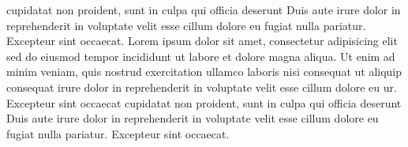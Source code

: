 \documentclass[a4paper, oneside, notitlepage, 12pt]{article}
\begin{document}
\begin{pages}
\begin{Leftside}
cupidatat non proident, sunt in culpa qui officia deserunt
Duis aute irure dolor in reprehenderit
in voluptate velit esse cillum dolore eu fugiat nulla
pariatur. Excepteur sint occaecat.
\pend
{}
Lorem ipsum dolor sit amet, consectetur adipisicing elit
sed do eiusmod tempor incididunt ut labore et dolore
magna aliqua. Ut enim ad minim veniam, quis nostrud
exercitation ullamco laboris nisi
 consequat ut aliquip consequat\pend[]
 irure dolor in reprehenderit
in voluptate velit esse cillum dolore eu ur. Excepteur sint occaecat
cupidatat non proident, sunt in culpa qui officia deserunt
Duis aute irure dolor in reprehenderit
in voluptate velit esse cillum dolore eu fugiat nulla
pariatur. Excepteur sint occaecat.
\pend
\endnumbering
\end{Leftside}

\begin{Rightside}


\end{Rightside}
\end{pages}
\end{document}
